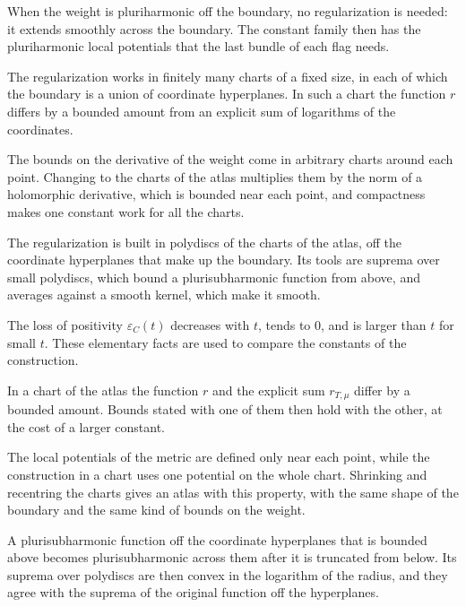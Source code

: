 When the weight is pluriharmonic off the boundary, no regularization is needed: it extends smoothly across the
boundary. The constant family then has the pluriharmonic local potentials that the last bundle of each flag needs.

The regularization works in finitely many charts of a fixed size, in each of which the boundary is a union of
coordinate hyperplanes. In such a chart the function $r$ differs by a bounded amount from an explicit sum of logarithms
of the coordinates.

The bounds on the derivative of the weight come in arbitrary charts around each point. Changing to the charts of the
atlas multiplies them by the norm of a holomorphic derivative, which is bounded near each point, and compactness makes
one constant work for all the charts.

The regularization is built in polydiscs of the charts of the atlas, off the coordinate hyperplanes that make up the
boundary. Its tools are suprema over small polydiscs, which bound a plurisubharmonic function from above, and averages
against a smooth kernel, which make it smooth.

The loss of positivity $\varepsilon_C(t)$ decreases with $t$, tends to $0$, and is larger than $t$ for small $t$. These
elementary facts are used to compare the constants of the construction.

In a chart of the atlas the function $r$ and the explicit sum $r_{T,\mu}$ differ by a bounded amount. Bounds stated with
one of them then hold with the other, at the cost of a larger constant.

The local potentials of the metric are defined only near each point, while the construction in a chart uses one
potential on the whole chart. Shrinking and recentring the charts gives an atlas with this property, with the same shape
of the boundary and the same kind of bounds on the weight.

A plurisubharmonic function off the coordinate hyperplanes that is bounded above becomes plurisubharmonic across them
after it is truncated from below. Its suprema over polydiscs are then convex in the logarithm of the radius, and they
agree with the suprema of the original function off the hyperplanes.

